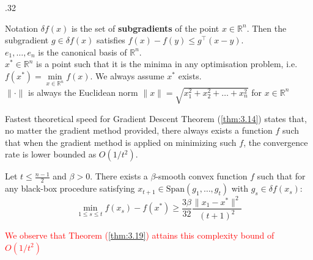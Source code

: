 \documentclass[final,t]{beamer}
\newcommand{\norm}[2][]{#1\lVert #2 #1\rVert}
\begin{document}
\begin{frame}[containsverbatim]
\begin{columns}[t]
\begin{column}{.32\linewidth}
    \begin{exampleblock}{Notation}
      $\delta f(x)$ is the set of \textbf{subgradients} of the point $x \in \mathbb{R}^n$. Then the subgradient $g \in \delta f(x)$ satisfies $f(x) - f(y) \leq g^\top (x-y)$. \\
      $e_1, \dots, e_n$ is the canonical basis of $\mathbb{R}^n$. \\
      $x^* \in \mathbb{R}^n$ is a point such that it is the minima in any optimisation problem, i.e. $f(x^*) = \mathop{\min}\limits_{x \in \mathbb{R}^n} f(x)$.
      We always assume $x^*$ exists. \\
      $\norm{\cdot}$ is always the Euclidean norm $\norm{x} = \sqrt{x_1^2 + x_2^2 + \dots + x_n^2}$ for $x \in \mathbb{R}^n$
    \end{exampleblock}
   \begin{exampleblock}{Fastest theoretical speed for Gradient Descent}
   Theorem (\ref{thm:3.14}) states that, no matter the gradient method provided, there
   always exists a function $f$ such that when the gradient method is applied on
   minimizing such $f$, the convergence rate is lower bounded as $O(1/t^2)$.
    \begin{theorem}[{\bf 1}] \label{thm:3.14}
      Let $t \leq \frac{n-1}{2}$ and $\beta > 0$. There exists a $\beta$-smooth convex function $f$ such that for any black-box procedure satisfying
      $x_{t+1} \in \text{Span}(g_1, \dots, g_t)$ with $g_s \in \delta f(x_s)$:
      \begin{equation*}
        \mathop{\min}\limits_{1 \leq s \leq t} f(x_s) - f(x^*) \geq \frac{3\beta}{32} \frac{\norm{x_1 - x^*}^2}{(t + 1)^2}
      \end{equation*}
    \end{theorem}
    \begin{center}
      \textcolor{red}{We observe that Theorem (\ref{thm:3.19}) attains this complexity bound of $O(1/t^2)$}
    \end{center}
    \end{exampleblock}


\end{column}
\end{columns}
\end{frame}
\end{document}
